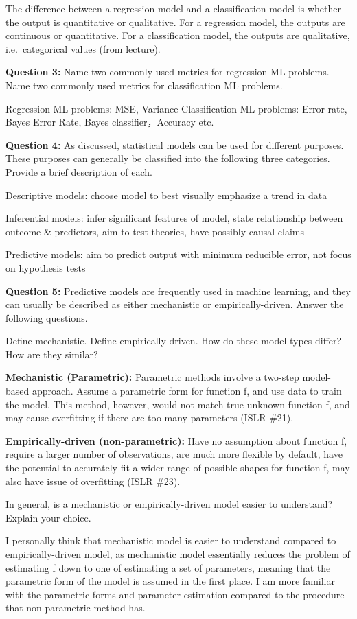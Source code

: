 \documentclass[
]{article}
\begin{document}
The difference between a regression model and a classification model is
whether the output is quantitative or qualitative. For a regression
model, the outputs are continuous or quantitative. For a classification
model, the outputs are qualitative, i.e.~categorical values (from
lecture).

\textbf{Question 3:} Name two commonly used metrics for regression ML
problems. Name two commonly used metrics for classification ML problems.

Regression ML problems: MSE, Variance Classification ML problems: Error
rate, Bayes Error Rate, Bayes classifier，Accuracy etc.

\textbf{Question 4:} As discussed, statistical models can be used for
different purposes. These purposes can generally be classified into the
following three categories. Provide a brief description of each.

Descriptive models: choose model to best visually emphasize a trend in
data

Inferential models: infer significant features of model, state
relationship between outcome \& predictors, aim to test theories, have
possibly causal claims

Predictive models: aim to predict output with minimum reducible error,
not focus on hypothesis tests

\textbf{Question 5:} Predictive models are frequently used in machine
learning, and they can usually be described as either mechanistic or
empirically-driven. Answer the following questions.

Define mechanistic. Define empirically-driven. How do these model types
differ? How are they similar?

\textbf{Mechanistic (Parametric):} Parametric methods involve a two-step
model-based approach. Assume a parametric form for function f, and use
data to train the model. This method, however, would not match true
unknown function f, and may cause overfitting if there are too many
parameters (ISLR \#21).

\textbf{Empirically-driven (non-parametric):} Have no assumption about
function f, require a larger number of observations, are much more
flexible by default, have the potential to accurately fit a wider range
of possible shapes for function f, may also have issue of overfitting
(ISLR \#23).

In general, is a mechanistic or empirically-driven model easier to
understand? Explain your choice.

I personally think that mechanistic model is easier to understand
compared to empirically-driven model, as mechanistic model essentially
reduces the problem of estimating f down to one of estimating a set of
parameters, meaning that the parametric form of the model is assumed in
the first place. I am more familiar with the parametric forms and
parameter estimation compared to the procedure that non-parametric
method has.
\end{document}
